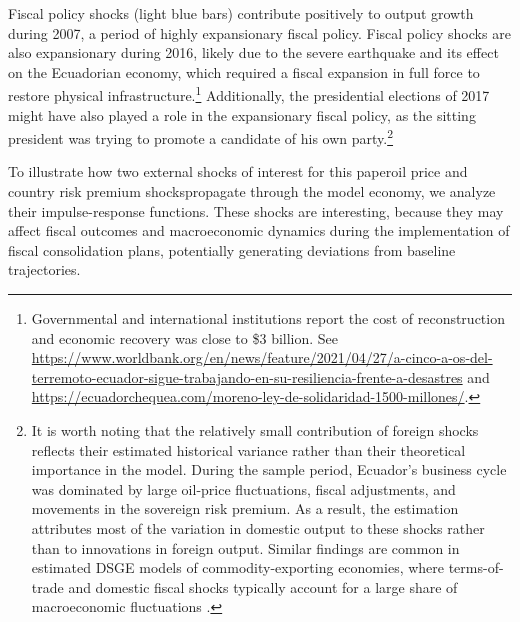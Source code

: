 \documentclass[12pt]{article}
\begin{document}
Fiscal policy shocks (light blue bars) contribute positively to output growth during 2007, a period of highly expansionary fiscal policy. Fiscal policy shocks are also expansionary during 2016, likely due to the severe earthquake and its effect on the Ecuadorian economy, which required a fiscal expansion in full force to restore physical infrastructure.\footnote{Governmental and international institutions report the cost of reconstruction and economic recovery was close to \$3 billion. See \url{https://www.worldbank.org/en/news/feature/2021/04/27/a-cinco-a-os-del-terremoto-ecuador-sigue-trabajando-en-su-resiliencia-frente-a-desastres} and \url{https://ecuadorchequea.com/moreno-ley-de-solidaridad-1500-millones/}.} Additionally, the presidential elections of 2017 might have also played a role in the expansionary fiscal policy, as the sitting president was trying to promote a candidate of his own party.\footnote{It is worth noting that the relatively small contribution of foreign shocks reflects their estimated historical variance rather than their theoretical importance in the model. During the sample period, Ecuador’s business cycle was dominated by large oil-price fluctuations, fiscal adjustments, and movements in the sovereign risk premium. As a result, the estimation attributes most of the variation in domestic output to these shocks rather than to innovations in foreign output. Similar findings are common in estimated DSGE models of commodity-exporting economies, where terms-of-trade and domestic fiscal shocks typically account for a large share of macroeconomic fluctuations \citep[see][for instance]{MedinaSoto2016, MelinaYangZanna2016}.}

To illustrate how two external shocks of interest for this paper\textemdash oil price and country risk premium shocks\textemdash propagate through the model economy, we analyze their impulse-response functions. These shocks are interesting, because they may affect fiscal outcomes and macroeconomic dynamics during the implementation of fiscal consolidation plans, potentially generating deviations from baseline trajectories.

\end{document}
